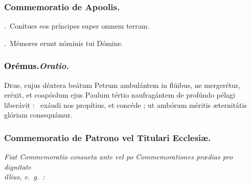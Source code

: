 \documentclass[12pt]{article} %
\newenvironment{rubric}{\vspace{2 mm}\color{benred8} \itshape \leftskip 0in \setlength{\parindent}{0.25in}}{\vspace{2 mm}}
\newenvironment{response}{\leftskip 0in \setlength{\parindent}{0in}}{\vspace{2 mm}}
\let\oldgresixstar\gresixstar
\renewcommand{\gresixstar}{\textcolor{benred8}{\oldgresixstar}}
\let\oldVbar\Vbar
\renewcommand{\Vbar}{\textcolor{benred8}{\oldVbar .}}
\let\oldRbar\Rbar
\renewcommand{\Rbar}{\textcolor{benred8}{\oldRbar .}}
\def\capitulumSpace{\hspace{20 mm}}
\begin{document}
\subsubsection*{Commemoratio de Apoolis.}


\gresetfirstlineaboveinitial{\small \textsc{ \textbf{\textcolor{benred8}{VIII}}}}{\small \textsc{ \textbf{\textcolor{benred8}{VIII}}}}

\begin{response}
\Vbar\ Con\'{i}tues eos pr\'{i}ncipes super omnem terram.

\Rbar\ M\'{e}mores erunt n\'{o}minis tui D\'{o}mine.

\end{response}

\subsubsection*{\textcolor{black}{Or\'{e}mus.}\capitulumSpace \emph{Oratio.}}

\begin{response}\lettrine{D}{e}us, cujus d\'{e}xtera be\'{a}tum Petrum ambul\'{a}ntem in fl\'{u}ibus, ne merger\'{e}tur, er\'{e}xit, et coap\'{o}olum ejus Paulum t\'{e}rtio naufrag\'{a}ntem de prof\'{u}ndo p\'{e}lagi liber\'{a}vit : \gresixstar\ ex\'{a}udi nos prop\'{i}tius, et conc\'{e}de ; ut amb\'{o}rum m\'{e}ritis \ae ternit\'{a}tis gl\'{o}riam consequ\'{a}mur.

\end{response}

\newpage


\subsubsection*{Commemoratio de Patrono vel Titulari Ecclesi\ae .}

\begin{rubric}
Fiat Commemoratio consueta ante vel po Commemorationes pr\ae dias pro dignitate\\illius, e.~g.~:

\end{rubric}
\end{document}
